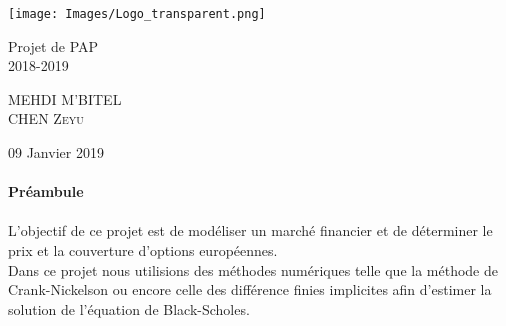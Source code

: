 \documentclass[a4paper, 12pt]{article}
\begin{document}
\begin{titlepage}
			\texttt{[image: Images/Logo\_transparent.png]} 
			\begin{center}

				\vspace*{6cm}
				{ \huge  
				Projet de PAP \\
				2018-2019 \\ }
			\vspace*{3cm}
				\begin{center} \large
					\textsc{MEHDI} \textsc{M'BITEL}\\
					\textsc{CHEN} \textsc{Zeyu}		
				\end{center}
				\begin{minipage}{0.4\textwidth}
				
				\end{minipage}

				{\large 09 Janvier 2019}
			\end{center}
	\end{titlepage}


	\renewcommand{\contentsname}{Sommaire} 
	{\setlength{\baselineskip}{1.2\baselineskip}
\tableofcontents\par}%
	
	
	\newpage
	\vspace*{3cm} %
	\paragraph{\Huge{Préambule}}

	\paragraph{}
	L'objectif de ce projet est de modéliser un marché financier et de déterminer le prix et la couverture d'options européennes.\\
	
	
	Dans ce projet nous utilisions des méthodes numériques telle que la méthode de Crank-Nickelson ou encore celle des différence finies implicites afin d'estimer la solution de l'équation de Black-Scholes.\\
	
\end{document}
